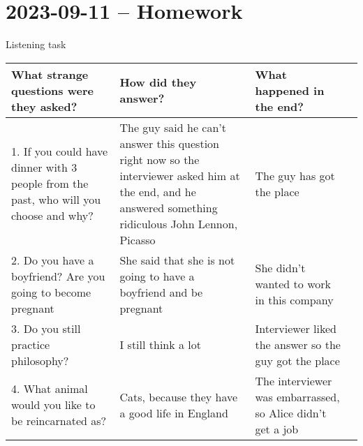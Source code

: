 \pagebreak
\section{2023-09-11 -- Homework}

Listening task

\begin{table}[htpb]
	\centering
	\label{tab:label}
	\begin{tabular}{|p{5cm}|p{5cm}|p{5cm}|p{5cm}|}
		\hline What strange questions were they asked? & How did they answer? & What happened in the end? \\[1cm]
		\hline 1. If you could have dinner with 3 people from the past, who will you choose and why? & The guy said he can't answer this question right now so the interviewer asked him at the end, and he answered something ridiculous John Lennon, Picasso & The guy has got the place \\[4cm] 
		\hline 2. Do you have a boyfriend? Are you going to become pregnant & She said that she is not going to have a boyfriend and be pregnant & She didn't wanted to work in this company \\[2cm]
		\hline 3. Do you still practice philosophy? & I still think a lot & Interviewer liked the answer so the guy got the place \\[2cm]
		\hline 4. What animal would you like to be reincarnated as? & Cats, because they have a good life in England & The interviewer was embarrassed, so Alice didn't get a job \\[2cm] \hline
	\end{tabular}
\end{table}
